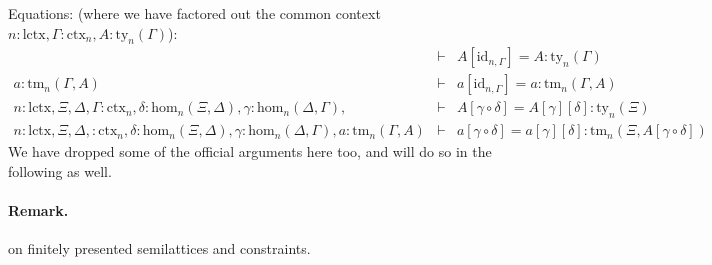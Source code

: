 \documentclass[11pt,a4paper]{article}
\theoremstyle{definition}
\newcommand{\id}{\mathsf{id}}
\newcommand{\UU}{\mathsf{U}}
\def\UU{\mathsf{U}}
\def\Hom{\mathrm{hom}}
\def\id{\mathrm{id}}
\def\lctx{\mathrm{lctx}}
\newcommand{\ctx}{\mathrm{ctx}}
\newcommand{\ty}{\mathrm{ty}}
\newcommand{\tm}{\mathrm{tm}}
\def\L{{\mathcal{L}}}
\def\CwF{\mathrm{CwF}}
\begin{document}
Equations: (where we have factored out the common context $n : \lctx, \Gamma : \ctx_n, A:\ty_n(\Gamma)$):
\begin{eqnarray*}
&\vdash& A[\id_{n,\Gamma}] = A : \ty_n(\Gamma)\\
a:\tm_n(\Gamma,A) &\vdash& a[\id_{n,\Gamma}] = a : \tm_n(\Gamma,A)\\
n : \lctx, \Xi,\Delta,\Gamma : \ctx_n, \delta : \Hom_n(\Xi,\Delta), \gamma : \Hom_n(\Delta,\Gamma),
&\vdash& A[\gamma\circ\delta] = A[\gamma][\delta]: \ty_n(\Xi)\\
n : \lctx, \Xi,\Delta, : \ctx_n, \delta : \Hom_n(\Xi,\Delta), \gamma : \Hom_n(\Delta,\Gamma),
a:\tm_n(\Gamma,A) &\vdash&
a[\gamma\circ\delta] = a[\gamma][\delta]: \tm_n(\Xi,A[\gamma\circ\delta])
\end{eqnarray*}
We have dropped some of the official arguments here too, and will do so in the following as well.
  

\paragraph{Remark.} on finitely presented semilattices and constraints.

\end{document}
